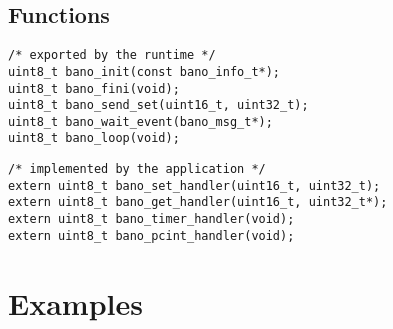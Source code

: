 \documentclass[a4paper, 11pt]{article}
\begin{document}
\subsection{Functions}
\begin{scriptsize}
\begin{verbatim}
/* exported by the runtime */
uint8_t bano_init(const bano_info_t*);
uint8_t bano_fini(void);
uint8_t bano_send_set(uint16_t, uint32_t);
uint8_t bano_wait_event(bano_msg_t*);
uint8_t bano_loop(void);
\end{verbatim}
\end{scriptsize}

\begin{scriptsize}
\begin{verbatim}
/* implemented by the application */
extern uint8_t bano_set_handler(uint16_t, uint32_t);
extern uint8_t bano_get_handler(uint16_t, uint32_t*);
extern uint8_t bano_timer_handler(void);
extern uint8_t bano_pcint_handler(void);
\end{verbatim}
\end{scriptsize}

\clearpage
\section{Examples}
\end{document}
